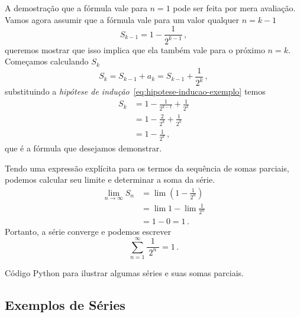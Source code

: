 \begin{example}
  A demostração que a fórmula vale para $n=1$ pode ser feita por mera avaliação.
  Vamos agora assumir que a fórmula vale para um valor qualquer $n=k-1$
  \begin{equation}
  	\label{eq:hipotese-inducao-exemplo}
  	S_{k-1} = 1 - \frac{1}{2^{k-1}} \,,
  \end{equation}
  queremos mostrar que isso implica que ela também vale para o próximo $n=k$.
  Começamos calculando $S_{k}$
  \[
  	S_{k} = S_{k-1} + a_{k} = S_{k-1} + \frac{1}{2^{k}} \,,
  \]
  substituindo a
  \emph{hipótese de indução}~\eqref{eq:hipotese-inducao-exemplo}
  temos
  \begin{align*}
  	S_{k} & = 1 - \frac{1}{2^{k-1}} + \frac{1}{2^{k}} \\[3mm]
  	      & = 1 - \frac{2}{2^{k}}   + \frac{1}{2^{k}} \\[3mm]
  	      & = 1 - \frac{1}{2^{k}} \,,
  \end{align*}
	que é a fórmula que desejamos demonstrar.

 Tendo uma expressão explícita para os termos da sequência de somas parciais,
 podemos calcular seu limite e determinar a soma da série.
 \begin{align*}
		\lim_{n\to\infty} S_n & = \lim \left(1 - \frac{1}{2^{n}}\right) \\[2mm]
		                      & = \lim 1 -   \lim\frac{1}{2^{n}}        \\[2mm]
		                      & = 1 - 0 = 1    \,.
	\end{align*}
	Portanto, a série converge e podemos escrever
	\[
		\sum_{n=1}^{\infty} \frac{1}{\;2^{n}\;} = 1  \,.
	\]
\end{example}

{
  Código Python para ilustrar algumas séries e suas somas parciais.
}

\subsection*{Exemplos de Séries}


